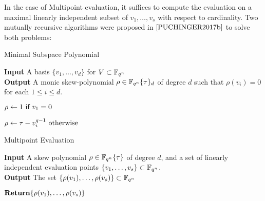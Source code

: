 In the case of Multipoint evaluation, it suffices to compute the evaluation on a maximal linearly independent subset of $v_1, \ldots, v_s$ with respect to cardinality. Two mutually recursive algorithms were proposed in $\cite{PUCHINGER2017b}$ to solve both problems:

\begin{algorithm}
\caption{Minimal Subspace Polynomial \cite{PUCHINGER2017b}}
\label{msp1}
\hspace*{\algorithmicindent} \textbf{Input} A basis $\{ v_1, \ldots, v_d \}$ for $V \subset \mathbb{F}_{q^n}$\\
 \hspace*{\algorithmicindent} \textbf{Output} A monic skew-polynomial $\rho \in \mathbb{F}_{q^n}\{\tau\}_d$ of degree $d$ such that $\rho(v_i) = 0$ for each $1 \leq i \leq d$.  \\
 \begin{algorithmic}[1]
            \State $\rho \gets 1 \textnormal{ if } v_1 = 0$

            \State  $ \rho \gets \tau - v_i^{q-1} \textnormal{ otherwise}$
        
    \EndIf
\end{algorithmic}
\end{algorithm}

\begin{algorithm}
\caption{Multipoint Evaluation \cite{PUCHINGER2017b}}
\label{mpe1}
\hspace*{\algorithmicindent} \textbf{Input} A skew polynomial $\rho \in \mathbb{F}_{q^n}\{\tau \}$ of degree $d$, and a set of linearly independent evaluation points $\{ v_1, \ldots, v_s \} \subset \mathbb{F}_{q^n}$. \\
 \hspace*{\algorithmicindent} \textbf{Output} The set $\{ \rho(v_1), \ldots, \rho(v_s) \} \subset  \mathbb{F}_{q^n}$ \\
 \begin{algorithmic}[1]
            \State $\textnormal{\textbf{Return}} \{\rho(v_1), \ldots, \rho(v_s) \}$
        
      \EndIf
 \end{algorithmic}
\end{algorithm}

